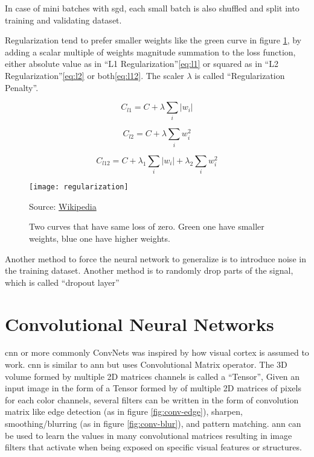 In case of mini batches with \gls{sgd}, each small batch is also shuffled and split into training and validating dataset.

Regularization\autocite{ng2004feature} tend to prefer smaller weights like the green curve in figure \ref{fig:regularization},
by adding a scalar multiple of weights magnitude summation to the loss function, either absolute value as in ``L1 Regularization''\ref{eq:l1}
or squared as in ``L2 Regularization''\ref{eq:l2} or both\ref{eq:l12}. The scaler \(\lambda\) is called ``Regularization Penalty''.


\begin{equation}
C_{l1} = C + \lambda \sum\limits_{i} | w_i |
\label{eq:l1}
\end{equation}

\begin{equation}
C_{l2} = C + \lambda \sum\limits_{i} w_i^2
\label{eq:l2}
\end{equation}

\begin{equation}
C_{l12} = C + \lambda_1 \sum\limits_{i} | w_i | + \lambda_2 \sum\limits_{i} w_i^2
\label{eq:l12}
\end{equation}


\begin{figure}[!h]
\centering
\texttt{[image: regularization]}
\caption{Two curves that have same loss of zero. Green one have smaller weights, blue one have higher weights. }\label{fig:regularization}
{Source: \href{https://commons.wikimedia.org/wiki/File:Regularization.svg}{Wikipedia}\hfill}
\end{figure}

Another method to force the neural network to generalize is to introduce noise in the training dataset.
Another method is to randomly drop parts of the signal, which is called ``dropout layer''

\section{Convolutional Neural Networks}

\gls{cnn} or more commonly ConvNets was inspired by how
visual cortex is assumed to work. \gls{cnn} is similar to \gls{ann} but uses Convolutional Matrix operator.
The 3D volume formed by multiple 2D matrices channels is called a ``Tensor'',
Given an input image in the form of a Tensor formed by of multiple 2D matrices of pixels for each color channels,
several filters can be written in the form of convolution matrix like edge detection (as in figure \ref{fig:conv-edge}),
sharpen, smoothing/blurring (as in figure \ref{fig:conv-blur}), and pattern matching.
\gls{ann} can be used to learn the values in many convolutional matrices resulting in image filters that
activate when being exposed on specific visual features or structures.

